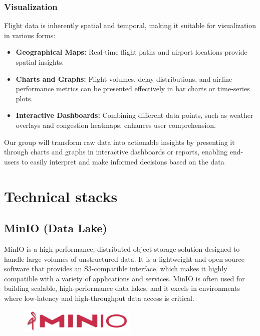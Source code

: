 \documentclass[12pt,a4paper]{article}
\begin{document}
\subsubsection{Visualization}
Flight data is inherently spatial and temporal, making it suitable for visualization in various forms:
\begin{itemize}
    \item \textbf{Geographical Maps:} Real-time flight paths and airport locations provide spatial insights.
    \item \textbf{Charts and Graphs:} Flight volumes, delay distributions, and airline performance metrics can be presented effectively in bar charts or time-series plots.
    \item \textbf{Interactive Dashboards:} Combining different data points, such as weather overlays and congestion heatmaps, enhances user comprehension.
\end{itemize}
Our group will transform raw data into actionable insights by presenting it through charts and graphs in interactive dashboards or reports, enabling end-users to easily interpret and make informed decisions based on the data

\section{Technical stacks}
\subsection{MinIO (Data Lake)}
MinIO is a high-performance, distributed object storage solution designed to handle large volumes of unstructured data. It is a lightweight and open-source software that provides an S3-compatible interface, which makes it highly compatible with a variety of applications and services. MinIO is often used for building scalable, high-performance data lakes, and it excels in environments where low-latency and high-throughput data access is critical.
\begin{figure}[h!]
    \begin{center}
        \includegraphics[width=0.5\textwidth]{Images/minIO.png}
    \end{center}
\end{figure}
\end{document}
